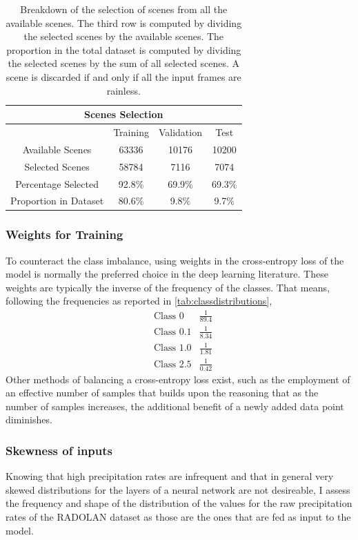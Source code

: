 \begin{table}[h]
    \centering
    \begin{tabular}{cccc}
    \hline
    \multicolumn{4}{c}{Scenes Selection} \\
    \hline
    \hline
         & Training & Validation & Test \\
    \hline
         Available Scenes & 63336 & 10176 & 10200 \\
         Selected Scenes & 58784 & 7116 & 7074 \\
         Percentage Selected & 92.8\% & 69.9\% & 69.3\% \\
         Proportion in Dataset & 80.6\% & 9.8\% & 9.7\% \\
         \hline
    \end{tabular}
    \caption{Breakdown of the selection of scenes from all the available scenes. The third row is computed by dividing the selected scenes by the available scenes. The proportion in the total dataset is computed by dividing the selected scenes by the sum of all selected scenes. A scene is discarded if and only if all the input frames are rainless.}
    \label{tab:rainydays}
\end{table}


\subsubsection{Weights for Training}
To counteract the class imbalance, using weights in the cross-entropy loss of the model is normally the preferred choice in the deep learning literature. These weights are typically the inverse of the frequency of the classes. That means, following the frequencies as reported in \cref{tab:classdistributions},
\begin{align*}
   & \text{Class 0} & \frac{1}{89.4} \\
   & \text{Class 0.1} & \frac{1}{8.34} \\
   & \text{Class 1.0} & \frac{1}{1.81} \\
   & \text{Class 2.5} & \frac{1}{0.42}
\end{align*}
Other methods of balancing a cross-entropy loss exist, such as the employment of an effective number of samples \citep{Cui2019Class-BalancedSamples} that builds upon the reasoning that as the number of samples increases, the additional benefit of a newly added data point diminishes.
\subsubsection{Skewness of inputs}
Knowing that high precipitation rates are infrequent and that in general very skewed distributions for the layers of a neural network are not desireable, I assess the frequency and shape of the distribution of the values for the raw precipitation rates of the RADOLAN dataset as those are the ones that are fed as input to the model. 

